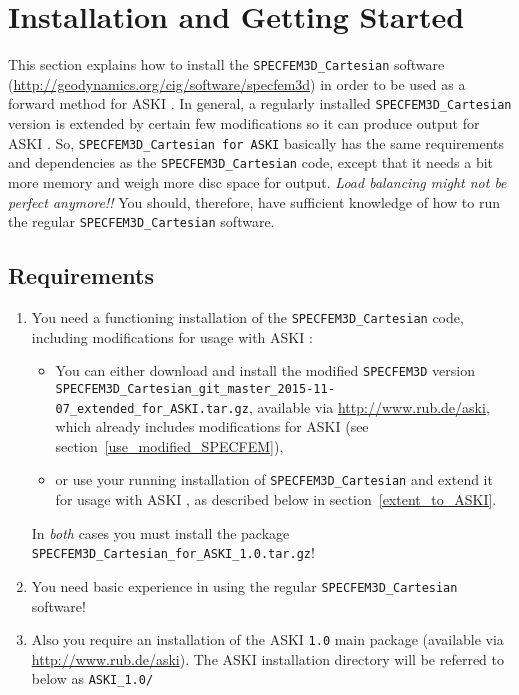 \documentclass[12pt,a4paper]{article}
\newcommand{\lcode}[1]{\nolinkurl{#1}}
\newcommand{\ASKI}{ {\ttfamily ASKI} }
\begin{document}
\section{Installation and Getting Started} \label{install}
%
This section explains how to install the \lcode{SPECFEM3D_Cartesian} software 
(\url{http://geodynamics.org/cig/software/specfem3d})
in order to be used as a forward method for \ASKI. 
In general, a regularly installed \lcode{SPECFEM3D_Cartesian} version is extended by certain few modifications 
so it can produce output for \ASKI. So, \lcode{SPECFEM3D_Cartesian for ASKI} basically has the same requirements 
and dependencies as the \lcode{SPECFEM3D_Cartesian} code, except that it needs a bit more memory and weigh more 
disc space for output. \emph{Load balancing might not be perfect anymore!!} You should, therefore, have sufficient 
knowledge of how to run the regular \lcode{SPECFEM3D_Cartesian} software. 

\subsection{Requirements} %
\begin{enumerate}
\item You need a functioning installation of the \lcode{SPECFEM3D_Cartesian} code, including 
   modifications for usage with \ASKI:
   \begin{itemize}
   \item You can either download and install the modified \lcode{SPECFEM3D} version \\
   \lcode{SPECFEM3D_Cartesian_git_master_2015-11-07_extended_for_ASKI.tar.gz}, available via 
   \url{http://www.rub.de/aski}, which already includes modifications for \ASKI (see section~\ref{use_modified_SPECFEM}{}),
 \item or use your running installation of \lcode{SPECFEM3D_Cartesian} and extend it for usage 
   with \ASKI, as described below in section~\ref{extent_to_ASKI}{}.
   \end{itemize}
   In \emph{both} cases you must install the package \lcode{SPECFEM3D_Cartesian_for_ASKI_1.0.tar.gz}!

 \item You need basic experience in using the regular \lcode{SPECFEM3D_Cartesian} software!
 \item Also you require an installation of the \ASKI \lcode{1.0} main package (available via 
   \url{http://www.rub.de/aski}). The \ASKI installation directory will be referred to 
   below as \lcode{ASKI_1.0/}
\end{enumerate}
\end{document}
